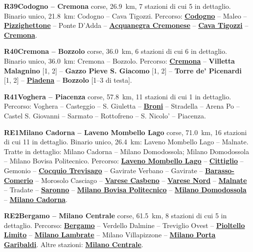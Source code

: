 \medskip\noindent\hypertarget{lin:R39}{\textbf{R39\enspace Codogno -- Cremona}} corse, \SI{26,9}{\km}, 7 stazioni di cui 5 in dettaglio. Binario unico, \SI{21,8}{\km}: Codogno -- Cava Tigozzi. Percorso: \hyperlink{sta:S01828}{\textbf{Codogno}} -- Maleo -- \hyperlink{sta:S01911}{\textbf{Pizzighettone}} -- Ponte D'Adda -- \hyperlink{sta:S01913}{\textbf{Acquanegra Cremonese}} -- \hyperlink{sta:S01914}{\textbf{Cava Tigozzi}} -- \hyperlink{sta:S01915}{\textbf{Cremona}}.

\medskip\noindent\hypertarget{lin:R40}{\textbf{R40\enspace Cremona -- Bozzolo}} corse, \SI{36,0}{\km}, 6 stazioni di cui 6 in dettaglio. Binario unico, \SI{36,0}{\km}: Cremona -- Bozzolo. Percorso: \hyperlink{sta:S01915}{\textbf{Cremona}} -- \hypertarget{sta:S01916}{\textbf{Villetta Malagnino}} [1, 2] -- \hypertarget{sta:S01917}{\textbf{Gazzo Pieve S. Giacomo}} [1, 2] -- \hypertarget{sta:S01918}{\textbf{Torre de' Picenardi}} [1, 2] -- \hyperlink{sta:S01919}{\textbf{Piadena}} -- \hypertarget{sta:S01920}{\textbf{Bozzolo}} [1--3 di testa].

\medskip\noindent\hypertarget{lin:R41}{\textbf{R41\enspace Voghera -- Piacenza}} corse, \SI{57,8}{\km}, 11 stazioni di cui 1 in dettaglio. Percorso: Voghera -- Casteggio -- S. Giuletta -- \hyperlink{sta:S01944}{\textbf{Broni}} -- Stradella -- Arena Po -- Castel S. Giovanni -- Sarmato -- Rottofreno -- S. Nicolo' -- Piacenza.

\medskip\noindent\hypertarget{lin:RE1}{\textbf{RE1\enspace Milano Cadorna -- Laveno Mombello Lago}} corse, \SI{71,0}{\km}, 16 stazioni di cui 11 in dettaglio. Binario unico, \SI{26,4}{\km}: Laveno Mombello Lago -- Malnate. Tratte in dettaglio: Milano Cadorna -- Milano Domodossola; Milano Domodossola -- Milano Bovisa Politecnico. Percorso: \hyperlink{sta:S01747}{\textbf{Laveno Mombello Lago}} -- \hyperlink{sta:S01746}{\textbf{Cittiglio}} -- Gemonio -- \hyperlink{sta:S01744}{\textbf{Cocquio Trevisago}} -- Gavirate Verbano -- Gavirate -- \hyperlink{sta:S01741}{\textbf{Barasso-Comerio}} -- Morosolo Casciago -- \hyperlink{sta:S01739}{\textbf{Varese Casbeno}} -- \hyperlink{sta:S01738}{\textbf{Varese Nord}} -- \hyperlink{sta:S01737}{\textbf{Malnate}} -- Tradate -- \hyperlink{sta:S01933}{\textbf{Saronno}} -- \hyperlink{sta:S01642}{\textbf{Milano Bovisa Politecnico}} -- \hyperlink{sta:S01067}{\textbf{Milano Domodossola}} -- \hyperlink{sta:S01066}{\textbf{Milano Cadorna}}.

\medskip\noindent\hypertarget{lin:RE2}{\textbf{RE2\enspace Bergamo -- Milano Centrale}} corse, \SI{61,5}{\km}, 8 stazioni di cui 5 in dettaglio. Percorso: \hyperlink{sta:S01529}{\textbf{Bergamo}} -- Verdello Dalmine -- Treviglio Ovest -- \hyperlink{sta:S01703}{\textbf{Pioltello Limito}} -- \hyperlink{sta:S01701}{\textbf{Milano Lambrate}} -- Milano Villapizzone -- \hyperlink{sta:S01645}{\textbf{Milano Porta Garibaldi}}. Altre stazioni: \hyperlink{sta:S01700}{\textbf{Milano Centrale}}.


